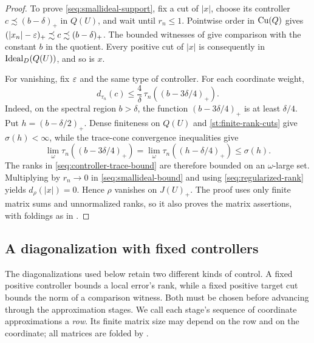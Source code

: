 \begin{proof}
To prove \eqref{seq:smallideal-support}, fix a cut of \(|x|\),
choose its controller \(c\precsim(b-\delta)_+\) in \(Q(U)\),
and wait until \(r_n\leq1\).
Pointwise order in \(\operatorname{Cu}(Q)\) gives
\((|x_n|-\varepsilon)_+\precsim c\precsim(b-\delta)_+\).
The bounded witnesses of  give comparison
with the constant \(b\) in the quotient. Every positive cut of
\(|x|\) is consequently in \(\operatorname{Ideal}_D(Q(U))\), and so is \(x\).

For vanishing, fix \(\varepsilon\) and the same type of controller.
For each coordinate weight,
\begin{equation}\label{seq:controller-trace-bound}
 d_{\tau_n}(c)
 \leq\frac4\delta\,
       \tau_n((b-3\delta/4)_+).
\end{equation}
Indeed, on the spectral region \(b>\delta\), the function
\((b-3\delta/4)_+\) is at least \(\delta/4\).
Put \(h=(b-\delta/2)_+\). Dense finiteness on \(Q(U)\) and
\eqref{st:finite-rank-cuts} give \(\sigma(h)<\infty\), while
the trace-cone convergence inequalities give
\[
 \lim_\omega\tau_n((b-3\delta/4)_+)
 =\lim_\omega\tau_n((h-\delta/4)_+)
 \leq\sigma(h).
\]
The ranks in \eqref{seq:controller-trace-bound} are therefore bounded
on an \(\omega\)-large set. Multiplying by \(r_n\to0\) in
\eqref{seq:smallideal-bound} and using
\eqref{seq:regularized-rank} yields \(d_\rho(|x|)=0\).
Hence \(\rho\) vanishes on \(J(U)_+\).
The proof uses only finite matrix sums and unnormalized ranks, so it
also proves the matrix assertions, with foldings as in
.
\end{proof}

\subsection{A diagonalization with fixed controllers}

The diagonalizations used below retain two different kinds of control.
A fixed positive controller bounds a local error's rank, while a
fixed positive target cut bounds the norm of a comparison witness.
Both must be chosen before advancing through the approximation
stages. We call each stage's sequence of coordinate approximations
a \emph{row}. Its finite matrix size may depend on the row and on
the coordinate; all matrices are folded by .

